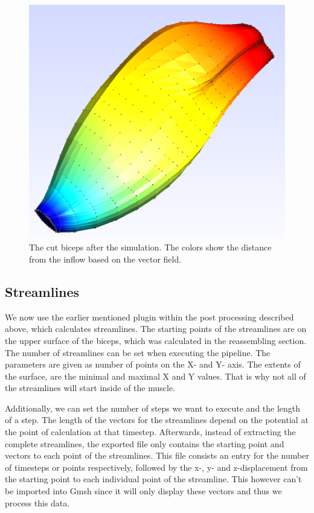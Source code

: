 \documentclass[preprint,journal]{vgtc}       %
\begin{document}
\begin{figure}
	\begin{center}
		\includegraphics[width=.7\linewidth]{Sim.png}
	\end{center}
	\caption{The cut biceps after the simulation. The colors show the distance from the inflow based on the vector field.}
	\label{fig:sim}
\end{figure}

\subsection{Streamlines}
We now use the earlier mentioned plugin within the post processing described above, which calculates streamlines. 
The starting points of the streamlines are on the upper surface of the biceps, which was calculated in the reassembling section. 
The number of streamlines can be set when executing the pipeline.
The parameters are given as number of points on the X- and Y- axis. 
The extents of the surface, are the minimal and maximal X and Y values. 
That is why not all of the streamlines will start inside of the muscle. 

Additionally, we can set the number of steps we want to execute  and the length of a step.
The length of the vectors for the streamlines depend on the potential at the point of calculation at that timestep.
Afterwards, instead of extracting the complete streamlines, the exported file only contains the starting point and vectors to each point of the streamlines. 
This file consists an entry for the number of timesteps or points respectively, followed by the x-, y- and z-displacement from the starting point to each individual point of the streamline.
This however can't be imported into Gmsh since it will only display these vectors and thus we process this data. 
\end{document}
